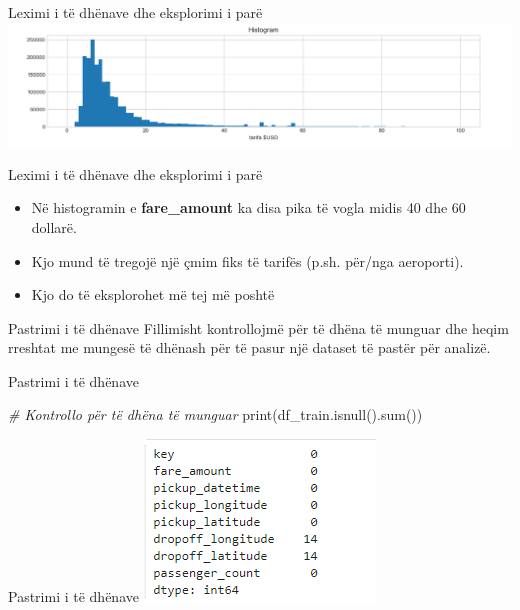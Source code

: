 \documentclass[
  ignorenonframetext,
]{beamer}
\newenvironment{Shaded}{\begin{snugshade}}{\end{snugshade}}
\newcommand{\BuiltInTok}[1]{#1}
\newcommand{\CommentTok}[1]{\textcolor[rgb]{0.56,0.35,0.01}{\textit{#1}}}
\newcommand{\NormalTok}[1]{#1}
\begin{document}
\begin{frame}{Leximi i të dhënave dhe eksplorimi i parë}
\protect\hypertarget{leximi-i-tuxeb-dhuxebnave-dhe-eksplorimi-i-paruxeb-13}{}
\includegraphics{./Figs/train4.png}
\end{frame}

\begin{frame}{Leximi i të dhënave dhe eksplorimi i parë}
\protect\hypertarget{leximi-i-tuxeb-dhuxebnave-dhe-eksplorimi-i-paruxeb-14}{}
\begin{itemize}
\item
  Në histogramin e \textbf{fare\_amount} ka disa pika të vogla midis 40
  dhe 60 dollarë.
\item
  Kjo mund të tregojë një çmim fiks të tarifës (p.sh. për/nga
  aeroporti).
\item
  Kjo do të eksplorohet më tej më poshtë
\end{itemize}
\end{frame}

\begin{frame}{Pastrimi i të dhënave}
\protect\hypertarget{pastrimi-i-tuxeb-dhuxebnave}{}
Fillimisht kontrollojmë për të dhëna të munguar dhe heqim rreshtat me
mungesë të dhënash për të pasur një dataset të pastër për analizë.
\end{frame}

\begin{frame}[fragile]{Pastrimi i të dhënave}
\protect\hypertarget{pastrimi-i-tuxeb-dhuxebnave-1}{}

\begin{Shaded}
\begin{Highlighting}[]
\CommentTok{\# Kontrollo për të dhëna të munguar}
\BuiltInTok{print}\NormalTok{(df\_train.isnull().}\BuiltInTok{sum}\NormalTok{())}
\end{Highlighting}
\end{Shaded}
\end{frame}

\begin{frame}{Pastrimi i të dhënave}
\protect\hypertarget{pastrimi-i-tuxeb-dhuxebnave-2}{}
\includegraphics{./Figs/train5.png}
\end{frame}
\end{document}
